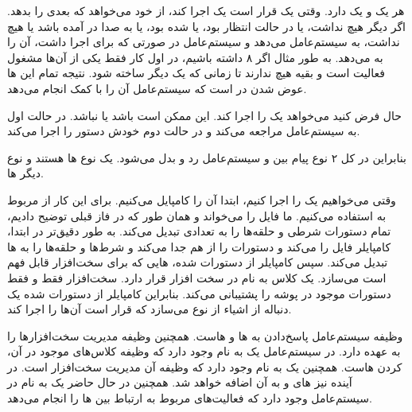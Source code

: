 \documentclass{article}
\begin{document}
هر 
یک 
و یک 
دارد. وقتی یک 
قرار است یک 
اجرا کند، از 
خود می‌خواهد که 
بعدی را بدهد. اگر 
دیگر هیچ 
نداشت، یا در حالت انتظار بود، یا 
شده بود، یا 
به صدا در آمده باشد یا 
هیچ 
نداشت، به سیستم‌عامل 
می‌دهد و سیستم‌عامل در صورتی که 
برای اجرا داشت، آن را به 
می‌دهد. به طور مثال اگر ۸ 
داشته باشیم، در اول کار فقط یکی از آن‌ها مشغول فعالیت است و بقیه هیچ 
ندارند تا زمانی که یک 
دیگر ساخته شود. نتیجه تمام این 
ها عوض شدن 
در 
است که سیستم‌عامل آن را با کمک 
انجام می‌دهد. 

حال فرض کنید 
می‌خواهد یک 
را اجرا کند. این 
ممکن است 
باشد یا نباشد. در حالت اول 
به سیستم‌عامل مراجعه می‌کند و در حالت دوم خودش دستور را اجرا می‌کند. 

بنابراین در کل ۲ نوع پیام بین 
و سیستم‌عامل رد و بدل می‌شود. یک نوع 
ها هستند و نوع دیگر 
ها. 

وقتی می‌خواهیم یک 
را اجرا کنیم، ابتدا آن را کامپایل می‌کنیم. برای این کار از 
مربوط به 
استفاده می‌کنیم. 
ما فایل را می‌خواند و همان طور که در فاز قبلی توضیح دادیم، تمام دستورات شرطی و حلقه‌ها را به تعدادی 
تبدیل می‌کند. به طور دقیق‌تر در ابتدا، کامپایلر فایل را 
می‌کند و دستورات را از هم جدا می‌کند و شرط‌ها و حلقه‌ها را به 
ها تبدیل می‌کند. سپس کامپایلر از دستورات 
شده، 
هایی که برای سخت‌افزار قابل فهم است می‌سازد. یک کلاس 
به نام 
در 
سخت افزار قرار دارد. سخت‌افزار فقط و فقط دستورات موجود در پوشه 
را پشتیبانی می‌کند. بنابراین کامپایلر از دستورات 
شده یک دنباله از اشیاء از نوع 
می‌سازد که قرار است 
آن‌ها را اجرا کند. 

وظیفه 
سیستم‌عامل پاسخ‌دادن به 
ها و 
هاست. همچنین وظیفه مدیریت سخت‌افزارها را به عهده دارد. در 
سیستم‌عامل یک 
به نام 
وجود دارد که وظیفه کلاس‌های موجود در آن، 
کردن 
هاست. همچنین یک 
به نام 
وجود دارد که وظیفه آن مدیریت سخت‌افزار 
است. در آینده نیز 
های 
و 
به آن اضافه خواهد شد. همچنین در حال حاضر یک 
به نام 
در 
سیستم‌عامل وجود دارد که فعالیت‌های مربوط به ارتباط بین 
ها را انجام می‌دهد. 
\end{document}
